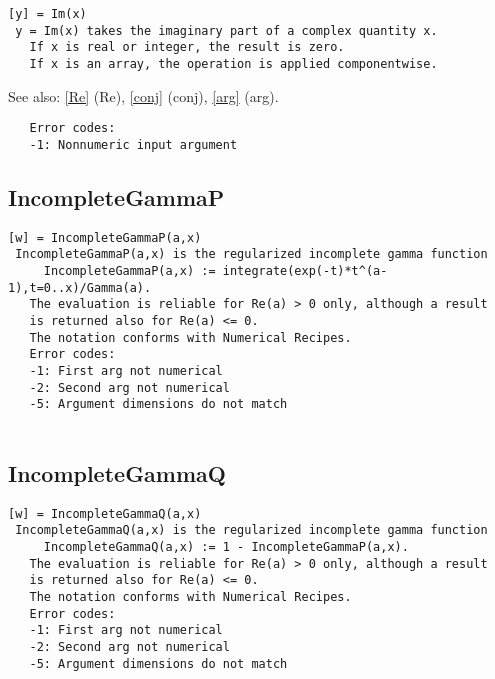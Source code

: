 \documentclass[a4paper]{article}
\begin{document}
\begin{tscreen}
\begin{verbatim}
[y] = Im(x)
 y = Im(x) takes the imaginary part of a complex quantity x.
   If x is real or integer, the result is zero.
   If x is an array, the operation is applied componentwise.
\end{verbatim}

See also: \ref{Re} {(Re)}, \ref{conj} {(conj)}, \ref{arg} {(arg)}.
\begin{verbatim}
   Error codes:
   -1: Nonnumeric input argument 
\end{verbatim}
\end{tscreen}





\subsection{IncompleteGammaP\label{IncompleteGammaP}}

\begin{tscreen}
\begin{verbatim}
[w] = IncompleteGammaP(a,x)
 IncompleteGammaP(a,x) is the regularized incomplete gamma function
     IncompleteGammaP(a,x) := integrate(exp(-t)*t^(a-1),t=0..x)/Gamma(a).
   The evaluation is reliable for Re(a) > 0 only, although a result
   is returned also for Re(a) <= 0.
   The notation conforms with Numerical Recipes.
   Error codes:
   -1: First arg not numerical
   -2: Second arg not numerical
   -5: Argument dimensions do not match
 
\end{verbatim}
\end{tscreen}





\subsection{IncompleteGammaQ\label{IncompleteGammaQ}}

\begin{tscreen}
\begin{verbatim}
[w] = IncompleteGammaQ(a,x)
 IncompleteGammaQ(a,x) is the regularized incomplete gamma function
     IncompleteGammaQ(a,x) := 1 - IncompleteGammaP(a,x).
   The evaluation is reliable for Re(a) > 0 only, although a result
   is returned also for Re(a) <= 0.
   The notation conforms with Numerical Recipes.
   Error codes:
   -1: First arg not numerical
   -2: Second arg not numerical
   -5: Argument dimensions do not match
 
\end{verbatim}
\end{tscreen}
\end{document}
